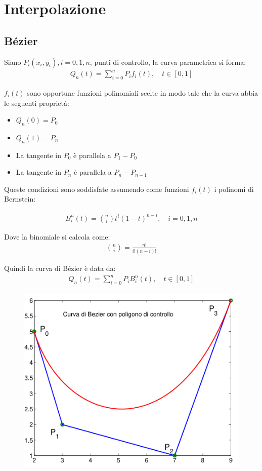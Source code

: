 \chapter{Interpolazione}
\section{B\'ezier}

Siano $P_i(x_i, y_i), i = 0, 1, n$, punti di controllo, la curva parametrica si forma:
\begin{align}
  Q_n(t) = \sum_{i=0}^n P_i f_i(t), \quad t \in [0, 1]
\end{align}

$f_i(t)$ sono opportune funzioni polinomiali scelte in modo tale che la curva abbia le seguenti proprietà:

\begin{itemize}
  \item $Q_n(0) = P_0$
  \item $Q_n(1) = P_n$
  \item La tangente in $P_0$ \`e parallela a $P_1 - P_0$
  \item La tangente in $P_n$ \`e parallela a $P_n - P_{n-1}$
\end{itemize}


Queste condizioni sono soddisfate assumendo come funzioni $f_i(t)$ i polinomi di Bernstein:

\begin{align}
  B_i^n(t) = \binom{n}{i} t^i (1-t)^{n-i}, \quad i = 0, 1, n
\end{align}

Dove la binomiale si calcola come:
\begin{align}
  \binom{n}{i} = \frac{n!}{i!(n-i)!}
\end{align}


Quindi la curva di B\'ezier \`e data da:
\begin{align}
  Q_n(t) = \sum_{i=0}^n P_i B_i^n(t), \quad t \in [0, 1]
\end{align}

\begin{figure}[h!]
  \centering
  \includegraphics[width=0.4\linewidth]{images/curva_bazier_esempio.png}
\end{figure}



